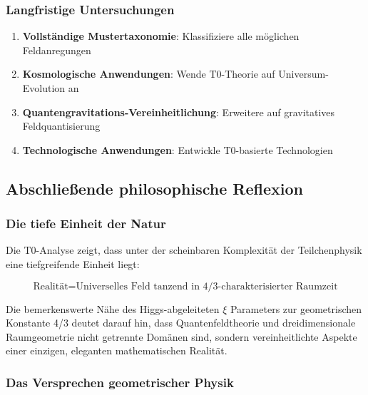 \documentclass[12pt,a4paper]{article}
\begin{document}
	\subsubsection{Langfristige Untersuchungen}
	\label{subsubsec:langfristige_untersuchungen}
	
	\begin{enumerate}
		\item \textbf{Vollständige Mustertaxonomie}: Klassifiziere alle möglichen Feldanregungen
		\item \textbf{Kosmologische Anwendungen}: Wende T0-Theorie auf Universum-Evolution an
		\item \textbf{Quantengravitations-Vereinheitlichung}: Erweitere auf gravitatives Feldquantisierung
		\item \textbf{Technologische Anwendungen}: Entwickle T0-basierte Technologien
	\end{enumerate}
	
	\subsection{Abschließende philosophische Reflexion}
	\label{subsec:abschliessende_reflexion}
	
	\subsubsection{Die tiefe Einheit der Natur}
	\label{subsubsec:tiefe_einheit}
	
	Die T0-Analyse zeigt, dass unter der scheinbaren Komplexität der Teilchenphysik eine tiefgreifende Einheit liegt:
	
	\begin{equation}
		\boxed{\text{Realität} = \text{Universelles Feld tanzend in 4/3-charakterisierter Raumzeit}}
		\label{eq:ultimative_realitaet}
	\end{equation}
	
	Die bemerkenswerte Nähe des Higgs-abgeleiteten $\xi$ Parameters zur geometrischen Konstante 4/3 deutet darauf hin, dass Quantenfeldtheorie und dreidimensionale Raumgeometrie nicht getrennte Domänen sind, sondern vereinheitlichte Aspekte einer einzigen, eleganten mathematischen Realität.
	
	\subsubsection{Das Versprechen geometrischer Physik}
	\label{subsubsec:versprechen_geometrischer_physik}
	
\end{document}
